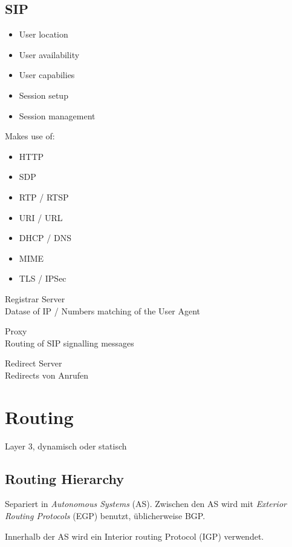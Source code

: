 \subsection{SIP}

\begin{itemize}
	\item User location
	\item User availability
	\item User capabilies
	\item Session setup
	\item Session management
\end{itemize}

Makes use of:
\begin{itemize}
	\item HTTP
	\item SDP
	\item RTP / RTSP
	\item URI / URL
	\item DHCP / DNS
	\item MIME
	\item TLS / IPSec
\end{itemize}

\begin{description}
	\item Registrar Server \hfill \\
		Datase of IP / Numbers matching of the User Agent
	\item Proxy \hfill \\
		Routing of SIP signalling messages
	\item Redirect Server \hfill \\
		Redirects von Anrufen
\end{description}

\section{Routing}

Layer 3, dynamisch oder statisch

\subsection{Routing Hierarchy}

Separiert in \emph{Autonomous Systems} (AS). Zwischen den AS wird mit \emph{Exterior Routing Protocols} (EGP) benutzt, üblicherweise BGP.

Innerhalb der AS wird ein Interior routing Protocol (IGP) verwendet.

